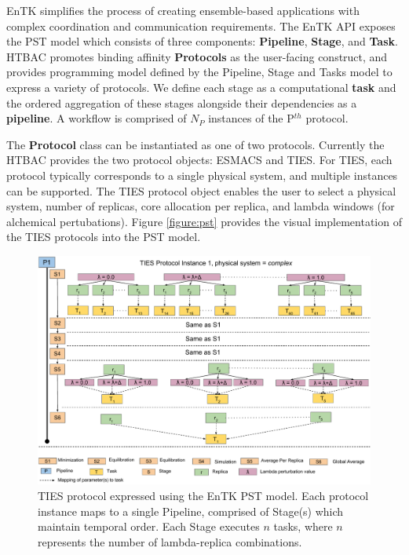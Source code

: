 
EnTK simplifies the process of creating ensemble-based applications with
complex coordination and communication requirements. The EnTK API exposes the
PST model which consists of three components: \textbf{Pipeline},
\textbf{Stage}, and \textbf{Task}. HTBAC promotes binding affinity  {\bf
Protocols} as the user-facing construct, and provides programming model
defined by the Pipeline, Stage and Tasks model to express a variety of
protocols. We define each stage as a computational \textbf{task} and the
ordered aggregation of these stages alongside their dependencies as a
\textbf{pipeline}. A workflow is comprised of $N_P$ instances of the P$^{th}$
protocol.

The \textbf{Protocol} class can be instantiated as one of two protocols.
Currently the HTBAC provides the two protocol objects: ESMACS and TIES. For
TIES, each protocol typically corresponds to a single physical system, and
multiple instances can be supported. The TIES protocol object enables the user
to select a physical system, number of replicas, core allocation per replica,
and lambda windows (for alchemical pertubations). Figure \ref{figure:pst}
provides the visual implementation of the TIES protocols into the PST model.




\begin{figure}
  \centering
   \includegraphics[width=\columnwidth]{figures/_TIES_EnTK_implementation.pdf}
  \caption{TIES protocol expressed using the EnTK PST model. Each protocol instance
  maps to a single Pipeline, comprised of Stage(s) which maintain temporal order. 
  Each Stage executes $n$ tasks, where $n$ represents the number of lambda-replica
  combinations.}
\label{fig:pst}
\end{figure}



